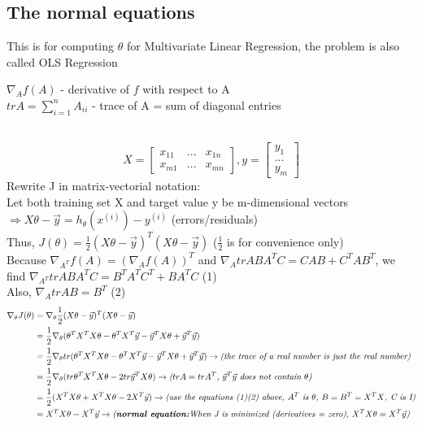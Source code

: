 \documentclass{article}
\begin{document}
\subsection{The normal equations}
\noindent This is for computing $\theta$ for Multivariate Linear Regression, the problem is also called OLS Regression
\begin{elaboration}
$\nabla_Af(A)$ - derivative of $f$ with respect to A\\
$trA = \sum^n_{i=1}A_{ii}$ - trace of A = sum of diagonal entries
\end{elaboration}\\
$$X = \left[\begin{matrix}
x_{11} & ... & x_{1n}\\
x_{m1} & ... & x_{mn}
\end{matrix}\right], y = \left[\begin{matrix} y_1 \\ ... \\ y_m\end{matrix}\right]$$
\noindent Rewrite J in matrix-vectorial notation:\\
\noindent Let both training set X and target value y be m-dimensional vectors $\Rightarrow X\theta - \vec y = h_\theta(x^{(i)}) - y^{(i)}$ (errors/residuals)\\
Thus, $J(\theta) = \frac{1}{2}(X\theta - \vec y)^T(X\theta - \vec y)$ ($\frac{1}{2}$ is for convenience only)\\
Because $\nabla_{A^T}f(A) = (\nabla_Af(A))^T$ and $\nabla_AtrABA^TC = CAB + C^TAB^T$, we find  $\nabla_{A^T}trABA^TC = B^TA^TC^T + BA^TC$ (1)\\
Also, $\nabla_AtrAB = B^T$ (2)
\begin{equation}\nonumber
    \begin{aligned}
        \nabla_\theta J(\theta) &= \nabla_\theta\frac{1}{2}(X\theta - \vec y)^T(X\theta - \vec y)\\
        &= \frac{1}{2}\nabla_\theta (\theta^TX^TX\theta - \theta^TX^T\vec y - \vec y^TX\theta + \vec y^T\vec y)\\
        &= \frac{1}{2}\nabla_\theta tr(\theta^TX^TX\theta - \theta^TX^T\vec y - \vec y^TX\theta + \vec y^T\vec y) \rightarrow \textit{(the trace of a real number is just the real number)}\\
        &= \frac{1}{2}\nabla_\theta (tr\theta^TX^TX\theta - 2tr \vec y^TX\theta) \rightarrow \textit{($trA = trA^T$, $\vec y^T\vec y$ does not contain $\theta$)}\\
        &= \frac{1}{2}(X^TX\theta + X^TX\theta - 2X^T\vec y) \rightarrow \textit{(use the equations (1)(2) above, $A^T$ is $\theta$, $B = B^T = X^TX$, C is I)}\\
        &= X^TX\theta - X^T\vec y \rightarrow \textit{(\textbf{normal equation:}When J is minimized (derivatives = zero), $X^TX\theta = X^T\vec y$)}
\end{aligned}
\end{equation}
\end{document}
